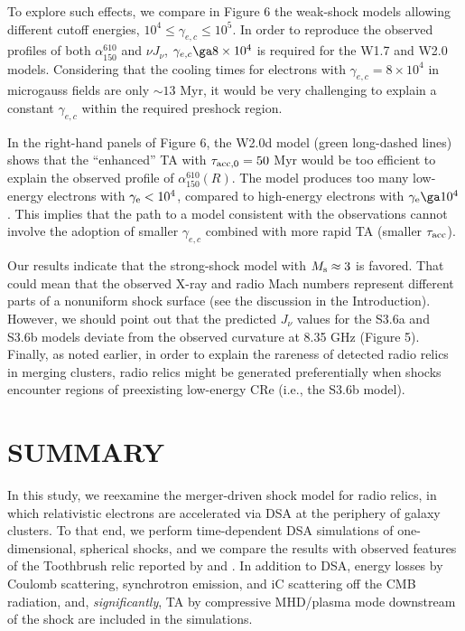 \documentclass[twocolumn]{aastex61}
\begin{document}
To explore such effects, we compare in Figure 6 the weak-shock models allowing different cutoff energies, 
$10^4 \le \gamma_{e,c} \le 10^5$. 
In order to reproduce the observed profiles of both $\alpha_{150}^{610}$ and $\nu J_{\nu}$,
$\gamma_{e,c}\ga 8\times 10^4$ is required for the W1.7 and W2.0 models.
Considering that the cooling times for electrons with $\gamma_{e,c} = 8\times 10^4$ in microgauss fields
are only $\sim 13$ Myr, it would be very challenging to explain a constant $\gamma_{e,c}$ within the required preshock region.

In the right-hand panels of Figure 6, the W2.0d model (green long-dashed lines) shows that
the ``enhanced'' TA with $\tau_{\rm acc,0}=50$ Myr would be too efficient to explain
the observed profile of $\alpha_{150}^{610} (R)$. The model produces too many low-energy electrons
with $\gamma_{\rm e}<10^4$, compared to high-energy electrons with $\gamma_{\rm e}\ga 10^4$.
This implies that the path to a model consistent with the observations 
cannot involve the adoption of smaller $\gamma_{e,c}$ combined with more rapid TA (smaller $\tau_{\rm acc}$).

Our results indicate that the strong-shock model with $M_{\rm s}\approx 3$ is favored.
That could mean that the observed X-ray and radio Mach numbers represent different parts of a nonuniform shock surface (see the discussion in the Introduction).
However, we should point out that the predicted $J_{\nu}$ values for the S3.6a and S3.6b models deviate from the observed
curvature at 8.35 GHz (Figure 5). 
Finally, as noted earlier, in order to explain the rareness of detected radio relics in merging clusters,
radio relics might be generated preferentially when shocks encounter regions of preexisting low-energy CRe (i.e., the S3.6b model).

\section{SUMMARY}

In this study, we reexamine the merger-driven shock model for radio relics, in which relativistic electrons 
are accelerated via DSA at the periphery of galaxy clusters.
To that end, we perform time-dependent DSA simulations of one-dimensional, spherical
shocks, and we compare the results with observed features of the Toothbrush relic
reported by \citet{stroe16} and \citet{vanweeren16}.
In addition to DSA, energy losses by Coulomb scattering, synchrotron emission, and iC scattering off the 
CMB radiation, and, {\it significantly}, TA by compressive MHD/plasma mode downstream of the shock
are included in the simulations.
\end{document}

